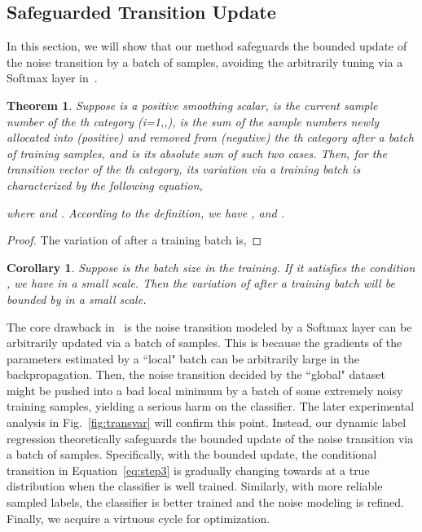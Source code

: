 \documentclass[journal]{IEEEtran}
\newtheorem{theorem}{Theorem}
\newtheorem{corollary}{Corollary}[theorem]
\begin{document}
\subsection{Safeguarded Transition Update}
In this section, we will show that our method safeguards the bounded update of the noise transition by a batch of samples, avoiding the arbitrarily tuning via a Softmax layer in~\cite{goldberger2016training}. 
\begin{theorem}\label{theorem:update}
Suppose  is a positive smoothing scalar,  is the current sample number of the th category (i=1,,),  is the sum of the sample numbers newly allocated into (positive) and removed from (negative) the th category after a batch of training samples, and  is its absolute sum of such two cases. Then, for the transition vector  of the th category, its variation via a training batch is characterized by the following equation,

where  and . According to the definition, we have ,  and .
\end{theorem}
\begin{proof}
The variation of  after a training batch is,

\end{proof}
\begin{corollary}
Suppose  is the batch size in the training. If it satisfies the condition , we have  in a small scale. Then the variation of  after a training batch will be bounded by  in a small scale.
\end{corollary}
The core drawback in~\cite{goldberger2016training} is the noise transition modeled by a Softmax layer can be arbitrarily updated via a batch of samples. This is because the gradients of the parameters estimated by a ``local" batch can be arbitrarily large in the backpropagation. Then, the noise transition decided by the ``global" dataset might be pushed into a bad local minimum by a batch of some extremely noisy training samples, yielding a serious harm on the classifier. The later experimental analysis in Fig.~\ref{fig:transvar} will confirm this point. Instead, our dynamic label regression theoretically safeguards the bounded update of the noise transition via a batch of samples. Specifically, with the bounded update, the conditional transition in Equation~\eqref{eq:step3} is gradually changing towards at a true distribution when the classifier is well trained. Similarly, with more reliable sampled labels, the classifier is better trained and the noise modeling is refined. Finally, we acquire a virtuous cycle for optimization.  
\end{document}
